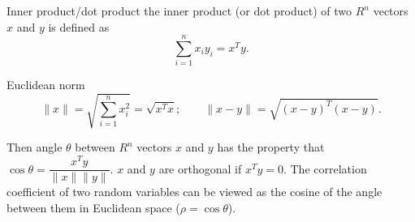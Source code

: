 \begin{concept}{Inner product/dot product}
the inner product (or dot product) of two $R^n$
vectors $x$ and $y$ is defined as
\[
\sum_{i=1}^{n}x_i y_i=x^Ty.
\]
\end{concept}

\begin{concept}{Euclidean norm}
\[
\lVert x\rVert=\sqrt{\sum_{i=1}^{n}x_i^2}=\sqrt{x^Tx};\qquad
\lVert x-y\rVert=\sqrt{(x-y)^T(x-y)}.
\]
\end{concept}

Then angle $\theta$ between $R^n$ vectors $x$ and $y$ has the property that
$\cos\theta=\dfrac{x^Ty}{\lVert x\rVert\lVert y\rVert}$. $x$ and $y$ are orthogonal if
$x^Ty=0$. The correlation coefficient of two random variables can be viewed as the cosine
of the angle between them in Euclidean space ($\rho=\cos\theta$).

